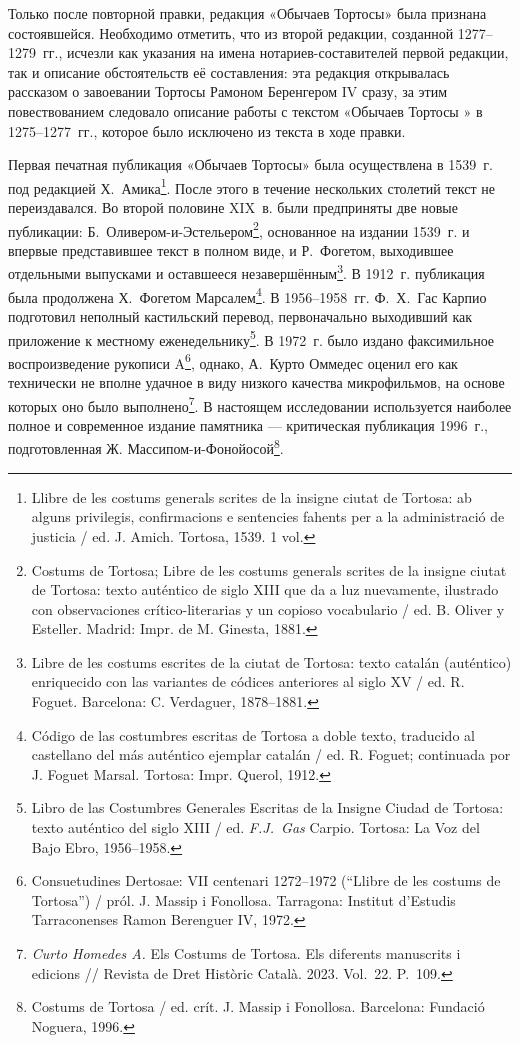 Только после повторной правки, редакция «Обычаев Тортосы» была признана состоявшейся. Необходимо отметить, что из второй редакции, созданной 1277--1279~гг., исчезли как указания на имена нотариев-составителей первой редакции, так и описание обстоятельств её составления: эта редакция открывалась рассказом о завоевании Тортосы Рамоном Беренгером IV сразу, за этим повествованием следовало описание работы с текстом «Обычаев Тортосы » в 1275--1277~гг., которое было исключено из текста в ходе правки.

Первая печатная публикация «Обычаев Тортосы» была осуществлена в 1539~г. под редакцией Х.~Амика\footnote{Llibre de les costums generals scrites de la insigne ciutat de Tortosa: ab alguns privilegis, confirmacions e sentencies fahents per a la administració de justicia / ed. J. Amich. Tortosa, 1539. 1 vol.}. После этого в течение нескольких столетий текст не переиздавался. Во второй половине XIX~в. были предприняты две новые публикации: Б.~Оливером-и-Эстельером\footnote{Costums de Tortosa; Libre de les costums generals scrites de la insigne ciutat de Tortosa: texto auténtico de siglo XIII que da a luz nuevamente, ilustrado con observaciones crítico-literarias y un copioso vocabulario / ed. B. Oliver y Esteller. Madrid: Impr. de M. Ginesta, 1881.}, основанное на издании 1539~г. и впервые представившее текст в полном виде, и Р.~Фогетом, выходившее отдельными выпусками и оставшееся незавершённым\footnote{Libre de les costums escrites de la ciutat de Tortosa: texto catalán (auténtico) enriquecido con las variantes de códices anteriores al siglo XV / ed. R. Foguet. Barcelona: C. Verdaguer, 1878--1881.}. В 1912~г. публикация была продолжена Х.~Фогетом Марсалем\footnote{Código de las costumbres escritas de Tortosa a doble texto, traducido al castellano del más auténtico ejemplar catalán / ed. R. Foguet; continuada por J. Foguet Marsal. Tortosa: Impr. Querol, 1912.}. В 1956--1958~гг. Ф.~Х.~Гас Карпио подготовил неполный кастильский перевод, первоначально выходивший как приложение к местному еженедельнику\footnote{Libro de las Costumbres Generales Escritas de la Insigne Ciudad de Tortosa: texto auténtico del siglo XIII / ed. \emph{F.J.~Gas} Carpio. Tortosa: La Voz del Bajo Ebro, 1956--1958.}. В 1972~г. было издано факсимильное воспроизведение рукописи A\footnote{Consuetudines Dertosae: VII centenari 1272--1972 (“Llibre de les costums de Tortosa”) / pról. J. Massip i Fonollosa. Tarragona: Institut d’Estudis Tarraconenses Ramon Berenguer IV, 1972.}, однако, А.~Курто Оммедес оценил его как технически не вполне удачное в виду низкого качества микрофильмов, на основе которых оно было выполнено\footnote{\emph{Curto Homedes A.} Els Costums de Tortosa. Els diferents manuscrits i edicions // Revista de Dret Històric Català. 2023. Vol.~22. P.~109.}. В настоящем исследовании используется наиболее полное и современное издание памятника --- критическая публикация 1996~г., подготовленная Ж. Массипом-и-Фонойосой\footnote{Costums de Tortosa / ed. crít. J. Massip i Fonollosa. Barcelona: Fundació Noguera, 1996.}.

